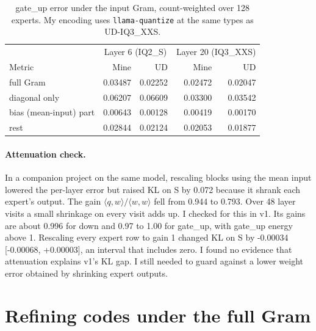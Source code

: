 \documentclass[11pt,a4paper]{article}
\newcommand{\code}[1]{\texttt{#1}}
\begin{document}
\begin{table}[t]
\centering\small
\caption{gate\_up error under the input Gram, count-weighted over 128 experts. My encoding uses \code{llama-quantize} at the same types as UD-IQ3\_XXS.}
\label{tab:gram}
\begin{tabular}{lrrrr}
\toprule
& \multicolumn{2}{c}{Layer 6 (IQ2\_S)} & \multicolumn{2}{c}{Layer 20 (IQ3\_XXS)} \\
Metric & Mine & UD & Mine & UD \\
\midrule
full Gram & 0.03487 & 0.02252 & 0.02472 & 0.02047 \\
diagonal only & 0.06207 & 0.06609 & 0.03300 & 0.03542 \\
bias (mean-input) part & 0.00643 & 0.00128 & 0.00419 & 0.00170 \\
rest & 0.02844 & 0.02124 & 0.02053 & 0.01877 \\
\bottomrule
\end{tabular}
\end{table}

\paragraph{Attenuation check.} In a companion project on the same model, rescaling blocks using the mean input lowered the per-layer error but raised KL on S by 0.072 because it shrank each expert's output. The gain $\langle q, w \rangle / \langle w, w \rangle$ fell from 0.944 to 0.793. Over 48 layer visits a small shrinkage on every visit adds up. I checked for this in v1. Its gains are about 0.996 for down and 0.97 to 1.00 for gate\_up, with gate\_up energy above 1. Rescaling every expert row to gain 1 changed KL on S by -0.00034 [-0.00068, +0.00003], an interval that includes zero. I found no evidence that attenuation explains v1's KL gap. I still needed to guard against a lower weight error obtained by shrinking expert outputs.

\section{Refining codes under the full Gram}
\label{sec:refine}
\end{document}
